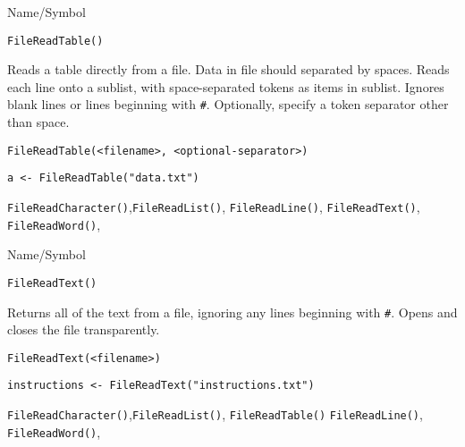 \begin{desc}{Name/Symbol}
\item[Name/Symbol]	\verb+FileReadTable()+

\item[Description]	Reads a table directly from a file. Data in file should
		separated by spaces.  Reads each line onto a sublist,
		with space-separated tokens as items in sublist.  Ignores
		blank lines or lines beginning with \verb+#+. Optionally,
		specify a token separator other than space.

\item[Usage]
\begin{verbatim}
FileReadTable(<filename>, <optional-separator>)
\end{verbatim}

\item[Example]
\begin{verbatim}
a <- FileReadTable("data.txt")
\end{verbatim}

\item[See Also]	
	\verb+FileReadCharacter()+,\verb+FileReadList()+, 
	\verb+FileReadLine()+, 	\verb+FileReadText()+, 	\verb+FileReadWord()+,

\end{desc}



\begin{desc}{Name/Symbol}
\item[Name/Symbol]	\verb+FileReadText()+

\item[Description]	Returns all of the text from a file, ignoring any lines
		beginning with \verb+#+. Opens and closes the file transparently.

\item[Usage]
\begin{verbatim}
FileReadText(<filename>)
\end{verbatim}

\item[Example]
\begin{verbatim}
instructions <- FileReadText("instructions.txt")
\end{verbatim}

\item[See Also]	
	\verb+FileReadCharacter()+,\verb+FileReadList()+, \verb+FileReadTable()+
	\verb+FileReadLine()+, 	\verb+FileReadWord()+,

\end{desc}


